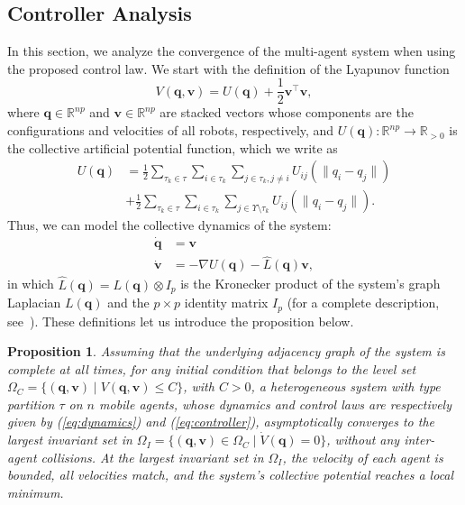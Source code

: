 \documentclass[letterpaper, 10 pt, conference]{ieeeconf}  %
\newcommand{\norm}[1]{\lVert#1\rVert}
\newtheorem{proposition}{Proposition}
\begin{document}
\subsection{Controller Analysis}
In this section, we analyze the convergence of the multi-agent system
when using the proposed control law. We start with the definition of
the Lyapunov function
\begin{equation}
  \label{eq:lyapunov}
  V(\mathbf{q},\mathbf{v}) = U(\mathbf{q}) + \frac{1}{2} \mathbf{v}^\intercal\mathbf{v},
\end{equation}
where $\mathbf{q} \in \mathbb{R}^{np}$ and $\mathbf{v} \in
\mathbb{R}^{np}$ are stacked vectors whose components are the
configurations and velocities of all robots, respectively, and
$U(\mathbf{q}): \mathbb{R}^{np} \to \mathbb{R}_{>0}$ is the collective
artificial potential function, which we write as
\begin{align}
  \label{eq:collective_potential}
  U(\mathbf{q}) &= \frac{1}{2} \sum_{\tau_k \in \tau} \sum_{i \in
    \tau_k} \sum_{j \in \tau_k, j \neq i} U_{ij}(\norm{q_i - q_j})
  \nonumber\\
  &+ \frac{1}{2} \sum_{\tau_k \in \tau} \sum_{i \in \tau_k} \sum_{j
    \in \Upsilon \setminus \tau_k} U_{ij}(\norm{q_i - q_j}).
\end{align}
Thus, we can model the collective dynamics of the system:
\begin{align}
  \label{eq:collective_dynamics_a}
  \dot{\mathbf{q}} &= \mathbf{v} \\
  \label{eq:collective_dynamics_b}
  \dot{\mathbf{v}} &= -\nabla U(\mathbf{q}) - \hat{L}(\mathbf{q})\mathbf{v},
\end{align}
in which $\hat{L}(\mathbf{q}) = L(\mathbf{q}) \otimes I_p $ is the
Kronecker product of the system's graph Laplacian $L(\mathbf{q})$ and
the $p \times p$ identity matrix $I_p$ (for a complete description,
see~\cite{Olfati-Saber:06}). These definitions let us introduce the
proposition below.

\begin{proposition}
  Assuming that the underlying adjacency graph of the system is
  complete at all times, for any initial condition that belongs to the
  level set $\Omega_C = \{(\mathbf{q},\mathbf{v}) \mid
  V(\mathbf{q},\mathbf{v}) \leq C\}$, with $C > 0$, a heterogeneous
  system with type partition $\tau$ on $n$ mobile agents, whose
  dynamics and control laws are respectively given by
  (\ref{eq:dynamics}) and (\ref{eq:controller}), asymptotically
  converges to the largest invariant set in $\Omega_I =
  \{(\mathbf{q},\mathbf{v}) \in \Omega_C \mid \dot{V}(\mathbf{q}) =
  0\}$, without any inter-agent collisions. At the largest invariant
  set in $\Omega_I$, the velocity of each agent is bounded, all
  velocities match, and the system's collective potential reaches a
  local minimum.
\end{proposition}
\end{document}
